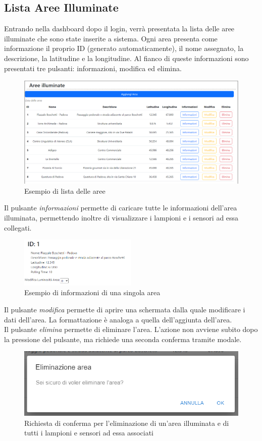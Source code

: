 \documentclass[a4paper, 12pt]{article}
\begin{document}
\subsection{Lista Aree Illuminate}
Entrando nella dashboard dopo il login, verrà presentata la lista delle aree illuminate che sono state inserite a sistema. Ogni area presenta come informazione il proprio ID (generato automaticamente), il nome assegnato, la descrizione, la latitudine e la longitudine. Al fianco di queste informazioni sono presentati tre pulsanti: informazioni, modifica ed elimina. \\
\begin{figure}[H]
\centering
\includegraphics[width=\textwidth]{ListaAree}
\caption{Esempio di lista delle aree}
\end{figure}
Il pulsante \textit{informazioni} permette di caricare tutte le informazioni dell'area illuminata, permettendo inoltre di visualizzare i lampioni e i sensori ad essa collegati.\\
\begin{figure}[H]
\centering
\includegraphics[width=0.5\textwidth]{InfoArea}
\caption{Esempio di informazioni di una singola area}
\end{figure}
Il pulsante \textit{modifica} permette di aprire una schermata dalla quale modificare i dati dell'area. La formattazione è analoga a quella dell'aggiunta dell'area.\\
Il pulsante \textit{elimina} permette di eliminare l'area. L'azione non avviene subito dopo la pressione del pulsante, ma richiede una seconda conferma tramite modale. \\
\begin{figure}[H]
\centering
\includegraphics[width=\textwidth]{ModaleEliminazioneArea}
\caption{Richiesta di conferma per l'eliminazione di un'area illuminata e di tutti i lampioni e sensori ad essa associati}
\end{figure}
\end{document}
